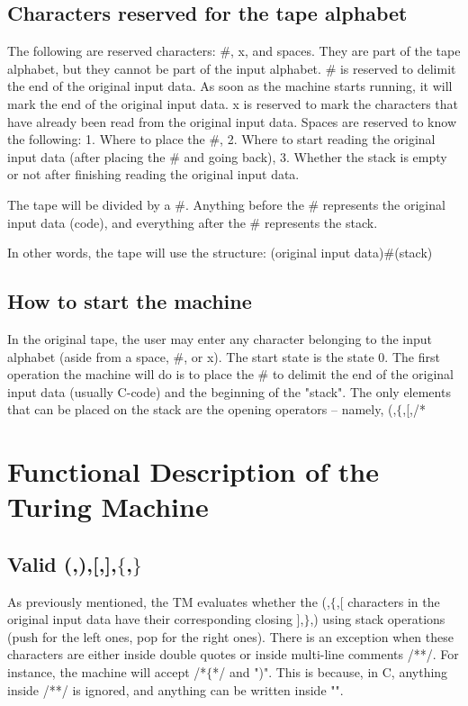 \documentclass{article}
\begin{document}
\subsection{Characters reserved for the tape alphabet}
The following are reserved characters: $\#$, x, and spaces. They are part of the tape alphabet, but they cannot be part of the 
input alphabet. $\#$ is reserved to delimit the end of the original input data. As soon as the machine starts running, it will mark the 
end of the original input data. x is reserved to mark the characters that have already been read from the original input data. 
Spaces are reserved to know the following: 1. Where to place the $\#$, 2. Where to start reading the original input data (after placing 
the $\#$ and going back), 3. Whether the stack is empty or not after finishing reading the original input data.

The tape will be divided by a $\#$. Anything before the $\#$ represents the original input data (code), and everything after the 
# represents the stack. 

In other words, the tape will use the structure: 
(original input data)$\#$(stack)

\subsection{How to start the machine}
In the original tape, the user may enter any character belonging to the input alphabet (aside from a space, #, or x). 
The start state is the state 0. The first operation the machine will do is to place the $\#$ to delimit the end of the 
original input data (usually C-code) and the beginning of the "stack". The only elements that can be placed on the stack are the opening 
operators -- namely, (,$\{$,[,/* 

\section{Functional Description of the Turing Machine}

\subsection{Valid (,),[,],$\{$,$\}$}
As previously mentioned, the TM evaluates whether the (,$\{$,[ characters in the original input data have their corresponding closing ],$\}$,) using stack operations (push for the left ones, pop for the right ones). 
There is an exception when these characters are either inside double quotes or inside  multi-line comments /**/. For instance, the machine will 
accept /*$\{$*/ and ")". This is because, in C, anything inside /**/ is ignored, and anything can be written inside "".
\end{document}
